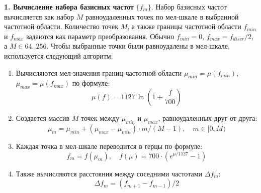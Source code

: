 \textbf{1. Вычисление набора базисных частот} $\{f_m\}$. 
Набор базисных частот вычисляется как набор $M$ равноудаленных точек по мел-шкале в выбранной частотной области.
Количество точек $M$, а также границы частотной области $f_{min}$ и $f_{max}$ задаются как параметр преобразования. 
Обычно $f_{min} = 0$, $f_{max} = f_{discr} / 2$, а $M \in {64 .. 256}$.
Чтобы выбранные точки были равноудалены в мел-шкале, используется следующий алгоритм:
\begin{enumerate}[1.]
  \item Вычисляются мел-значения границ частотной области $\mu_{min} = \mu(f_{min})$, $\mu_{max} = \mu(f_{max})$ по формуле:
  \begin{equation}
    \mu(f) = 1127\,\ln(1 + \frac{f}{700})
  \end{equation}
  
  \item Создается массив $M$ точек между $\mu_{min}$ и $\mu_{max}$, равноудаленных друг от друга:
  \begin{equation}
    \mu_m = \mu_{min} + (\mu_{max} - \mu_{min}) \cdot m / (M - 1), \quad m \in [0, M)
  \end{equation}

  \item Каждая точка в мел-шкале переводится в герцы по формуле:
  \begin{equation}
    f_m = f(\mu_m), \quad f(\mu) = 700 \cdot (e^{\mu / 1127} - 1)
  \end{equation}

  \item Также вычисляются расстояния между соседними частотами $\Delta f_m$:
  \begin{equation}
    \Delta f_m = (f_{m+1} - f_{m-1}) / 2
  \end{equation}
\end{enumerate}

